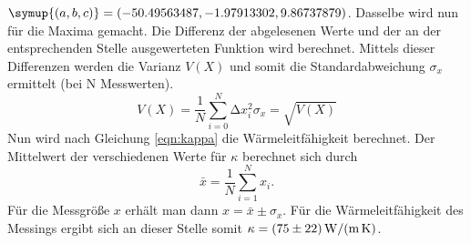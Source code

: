 $\symup{(a,b,c)}=(-50.49563487, -1.97913302, 9.86737879)$.
Dasselbe wird nun für die Maxima gemacht.
Die Differenz der abgelesenen Werte und der an der entsprechenden Stelle ausgewerteten Funktion wird berechnet. 
Mittels dieser Differenzen werden die Varianz $V(X)$ und somit die Standardabweichung $\sigma_x$ ermittelt (bei N Messwerten). 
\begin{equation*}
V(X)= \frac{1}{N} \sum_{i=0}^N \increment x_i ^2 

\sigma_x = \sqrt{V(X)} 
\end{equation*}
Nun wird nach Gleichung \eqref{eqn:kappa} die Wärmeleitfähigkeit berechnet. 
Der Mittelwert der verschiedenen Werte für $\kappa$ berechnet sich durch 
\begin{equation}
\bar{x} = \frac{1}{N} \sum_{i=1}^N x_i .
\label{eqn:average}
\end{equation}
Für die Messgröße $x$ erhält man dann $x = \bar{x} \pm \sigma_x$.
Für die Wärmeleitfähigkeit des Messings ergibt sich an dieser Stelle somit $\kappa = \SI{75 \pm 22}{\watt\per\meter\per\kelvin} $.

